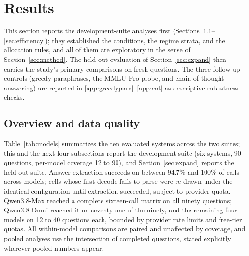 \section{Results}
\label{sec:results}

This section reports the development-suite analyses first (Sections~\ref{sec:overview}--\ref{sec:efficiency}); they established the conditions, the regime strata, and the allocation rules, and all of them are exploratory in the sense of Section~\ref{sec:method}. The held-out evaluation of Section~\ref{sec:expand} then carries the study's primary comparisons on fresh questions. The three follow-up controls (greedy paraphrases, the MMLU-Pro probe, and chain-of-thought answering) are reported in \ref{app:greedypara}--\ref{app:cot} as descriptive robustness checks.

\subsection{Overview and data quality}
\label{sec:overview}

Table~\ref{tab:models} summarizes the ten evaluated systems across the two suites; this and the next four subsections report the development suite (six systems, 90 questions, per-model coverage 12 to 90), and Section~\ref{sec:expand} reports the held-out suite. Answer extraction succeeds on between 94.7\% and 100\% of calls across models; cells whose first decode fails to parse were re-drawn under the identical configuration until extraction succeeded, subject to provider quota. Qwen3.8-Max reached a complete sixteen-call matrix on all ninety questions; Qwen3.8-Omni reached it on seventy-one of the ninety, and the remaining four models on 12 to 40 questions each, bounded by provider rate limits and free-tier quotas. All within-model comparisons are paired and unaffected by coverage, and pooled analyses use the intersection of completed questions, stated explicitly wherever pooled numbers appear.

\begin{table}[htbp]
\centering
\small
\caption{Evaluated systems, endpoints, and coverage across the two suites. Parse rate is the fraction of calls from which the mandated answer format was extracted after retries; $n$ is the number of questions with a complete call matrix. $^\dagger$Also the stem-paraphrase generator; its held-out row carries a self-preference risk (Section~\ref{sec:setup}) and is a partial replication excluded from pooled analyses. $^\ddagger$Completed on the second endpoint after the first exhausted its free tier. $^\S$Partial (13 of 119), excluded from tabulation. All systems run direct-answer on multiple-choice tasks and chain-of-thought on GSM8K.}
\label{tab:models}

\end{table}

